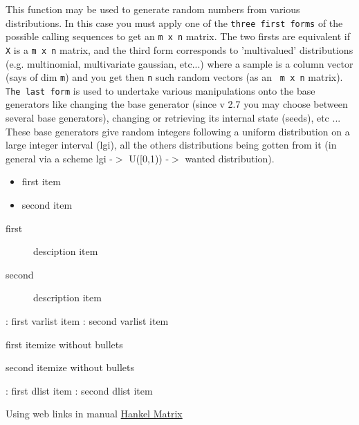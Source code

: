 \begin{mandescription}
  This function may be used to generate random numbers from various
  distributions. In this case you must apply one of the \verb!three first forms!
  of the possible calling sequences to get an \verb!m x n! matrix.  The two
  firsts are equivalent if \verb!X! is a \verb!m x n! matrix, and the third form
  corresponds to 'multivalued' distributions (e.g. multinomial, multivariate
  gaussian, etc...) where a sample is a column vector (says of dim \verb!m!)
  and you get then \verb!n! such random vectors (as an \verb! m x n! matrix).
  \verb!The last form! is used to undertake various manipulations onto the base
  generators like changing the base generator (since v 2.7 you may choose
  between several base generators), changing or retrieving its internal state
  (seeds), etc ... These base generators give random integers following a
  uniform distribution on a large integer interval (lgi), all the others
  distributions being gotten from it (in general via a scheme lgi -$>$ U([0,1))
  -$>$ wanted distribution).

  \begin{itemize}
  \item first item 
  \item second item 
  \end{itemize}

  \begin{description}
  \item[first] desciption item 
  \item[second] description item 
  \end{description}

  \begin{varlist}
    : first varlist item 
    : second varlist item
  \end{varlist}


  \begin{nbitemize}
    \item  first itemize without bullets 
    \item  second itemize without bullets
  \end{nbitemize}

  \begin{nbitemize}
    : first dlist item 
    : second dlist item
  \end{nbitemize}

  Using web links in manual 
  \href{http://en.wikipedia.org/wiki/Hankel_matrix}{Hankel Matrix}

\end{mandescription}


